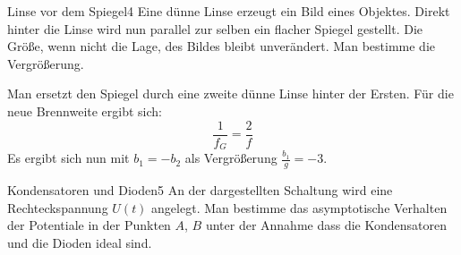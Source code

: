 



\begin{problem}{Linse vor dem Spiegel}{4}
Eine dünne Linse erzeugt ein Bild eines Objektes. Direkt hinter die Linse wird nun parallel zur selben ein flacher Spiegel gestellt. Die Größe, wenn nicht die Lage, des Bildes bleibt unverändert. Man bestimme die Vergrößerung.
\begin{solution}
Man ersetzt den Spiegel durch eine zweite dünne Linse hinter der Ersten. Für die neue Brennweite ergibt sich:
\[ \frac{1}{f_G}=\frac{2}{f} \]
Es ergibt sich nun mit $b_1=-b_2$ als Vergrößerung $\frac{b_1}{g}=-3$.
\end{solution}
\end{problem}

\begin{problem}{Kondensatoren und Dioden}{5}
An der dargestellten Schaltung wird eine Rechteckspannung $U(t)$ angelegt. Man bestimme das asymptotische Verhalten der Potentiale in der Punkten $A$, $B$ unter der Annahme dass die Kondensatoren und die Dioden ideal sind.
\end{problem}

